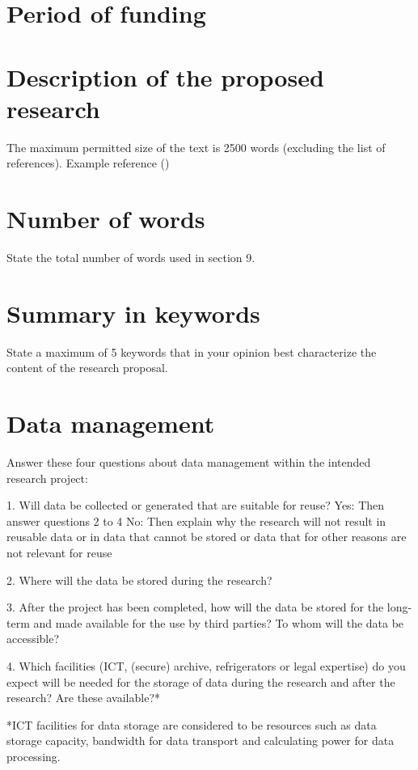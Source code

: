 \documentclass{article}
\begin{document}
\section{Period of funding}

\section{Description of the proposed research}
The maximum permitted size of the text is 2500 words (excluding the list of references).
Example reference (\cite{suzuki2016semantic})







\section{Number of words}
State the total number of words used in section 9.

\section{Summary in keywords}
State a maximum of 5 keywords that in your opinion best characterize the content of the research proposal.

\section{Data management}
Answer these four questions about data management within the intended research project:

    1. Will data be collected or generated that are suitable for reuse?
Yes: Then answer questions 2 to 4 
No: Then explain why the research will not result in reusable data or in data that cannot be stored or data that for other reasons are not relevant for reuse 

    2. Where will the data be stored during the research?

    3. After the project has been completed, how will the data be stored for the long-term and made available for the use by third parties? To whom will the data be accessible?

    4. Which facilities (ICT, (secure) archive, refrigerators or legal expertise) do you expect will be needed for the storage of data during the research and after the research? Are these available?*

*ICT facilities for data storage are considered to be resources such as data storage capacity, bandwidth for data transport and calculating power for data processing. 
\end{document}
